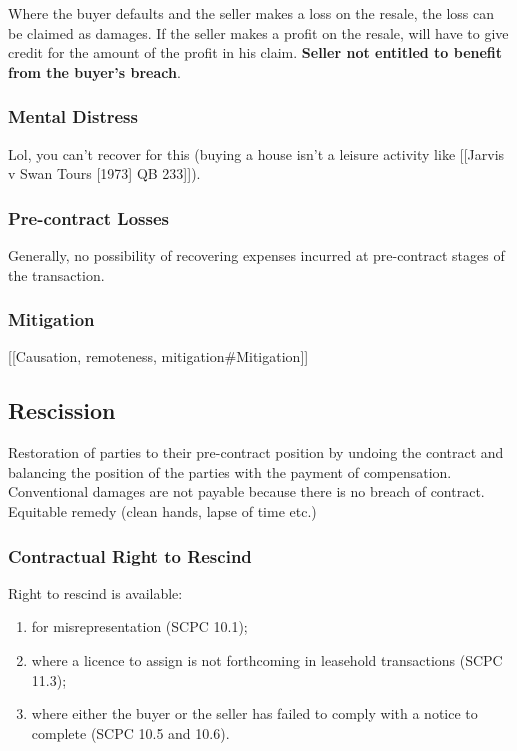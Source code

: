 \documentclass[
]{article}
\providecommand{\tightlist}{%
  \setlength{\itemsep}{0pt}\setlength{\parskip}{0pt}}
\begin{document}
Where the buyer defaults and the seller makes a loss on the resale, the
loss can be claimed as damages. If the seller makes a profit on the
resale, will have to give credit for the amount of the profit in his
claim. \textbf{Seller not entitled to benefit from the buyer's breach}.

\hypertarget{mental-distress}{%
\subsubsection{Mental Distress}\label{mental-distress}}

Lol, you can't recover for this (buying a house isn't a leisure activity
like {[}{[}Jarvis v Swan Tours {[}1973{]} QB 233{]}{]}).

\hypertarget{pre-contract-losses}{%
\subsubsection{Pre-contract Losses}\label{pre-contract-losses}}

Generally, no possibility of recovering expenses incurred at
pre-contract stages of the transaction.

\hypertarget{mitigation}{%
\subsubsection{Mitigation}\label{mitigation}}

{[}{[}Causation, remoteness, mitigation\#Mitigation{]}{]}

\hypertarget{rescission}{%
\subsection{Rescission}\label{rescission}}

Restoration of parties to their pre-contract position by undoing the
contract and balancing the position of the parties with the payment of
compensation. Conventional damages are not payable because there is no
breach of contract. Equitable remedy (clean hands, lapse of time etc.)

\hypertarget{contractual-right-to-rescind}{%
\subsubsection{Contractual Right to
Rescind}\label{contractual-right-to-rescind}}

Right to rescind is available:

\begin{enumerate}
\def\labelenumi{\arabic{enumi}.}
\tightlist
\item
  for misrepresentation (SCPC 10.1);
\item
  where a licence to assign is not forthcoming in leasehold transactions
  (SCPC 11.3);
\item
  where either the buyer or the seller has failed to comply with a
  notice to complete (SCPC 10.5 and 10.6).
\end{enumerate}
\end{document}
